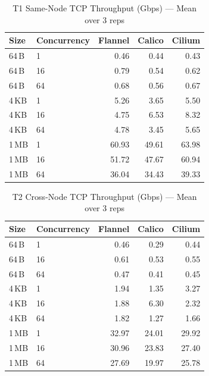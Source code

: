 \documentclass[11pt,a4paper]{article}
\begin{document}
\begin{table}[H]
\centering
\caption{T1 Same-Node TCP Throughput (Gbps) --- Mean over 3 reps}
\begin{tabular}{llrrr}
  \toprule
  \textbf{Size} & \textbf{Concurrency} & \textbf{Flannel} & \textbf{Calico} & \textbf{Cilium} \\
  \midrule
  64\,B  & 1  & 0.46 & 0.44 & 0.43 \\
  64\,B  & 16 & 0.79 & 0.54 & 0.62 \\
  64\,B  & 64 & 0.68 & 0.56 & 0.67 \\
  4\,KB  & 1  & 5.26 & 3.65 & 5.50 \\
  4\,KB  & 16 & 4.75 & 6.53 & 8.32 \\
  4\,KB  & 64 & 4.78 & 3.45 & 5.65 \\
  1\,MB  & 1  & 60.93 & 49.61 & 63.98 \\
  1\,MB  & 16 & 51.72 & 47.67 & 60.94 \\
  1\,MB  & 64 & 36.04 & 34.43 & 39.33 \\
  \bottomrule
\end{tabular}
\label{tab:kc-t1}
\end{table}

\begin{table}[H]
\centering
\caption{T2 Cross-Node TCP Throughput (Gbps) --- Mean over 3 reps}
\begin{tabular}{llrrr}
  \toprule
  \textbf{Size} & \textbf{Concurrency} & \textbf{Flannel} & \textbf{Calico} & \textbf{Cilium} \\
  \midrule
  64\,B  & 1  & 0.46 & 0.29 & 0.44 \\
  64\,B  & 16 & 0.61 & 0.53 & 0.55 \\
  64\,B  & 64 & 0.47 & 0.41 & 0.45 \\
  4\,KB  & 1  & 1.94 & 1.35 & 3.27 \\
  4\,KB  & 16 & 1.88 & 6.30 & 2.32 \\
  4\,KB  & 64 & 1.82 & 1.27 & 1.66 \\
  1\,MB  & 1  & 32.97 & 24.01 & 29.92 \\
  1\,MB  & 16 & 30.96 & 23.83 & 27.40 \\
  1\,MB  & 64 & 27.69 & 19.97 & 25.78 \\
  \bottomrule
\end{tabular}
\label{tab:kc-t2}
\end{table}
\end{document}
